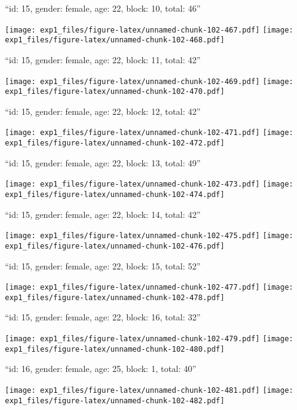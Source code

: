 \documentclass[11pt,,]{article}
\begin{document}
\newpage
[1] 

``id: 15, gender: female, age: 22, block: 10, total: 46''

\texttt{[image: exp1\_files/figure-latex/unnamed-chunk-102-467.pdf]}
\texttt{[image: exp1\_files/figure-latex/unnamed-chunk-102-468.pdf]}

\newpage
[1] 

``id: 15, gender: female, age: 22, block: 11, total: 42''

\texttt{[image: exp1\_files/figure-latex/unnamed-chunk-102-469.pdf]}
\texttt{[image: exp1\_files/figure-latex/unnamed-chunk-102-470.pdf]}

\newpage
[1] 

``id: 15, gender: female, age: 22, block: 12, total: 42''

\texttt{[image: exp1\_files/figure-latex/unnamed-chunk-102-471.pdf]}
\texttt{[image: exp1\_files/figure-latex/unnamed-chunk-102-472.pdf]}

\newpage
[1] 

``id: 15, gender: female, age: 22, block: 13, total: 49''

\texttt{[image: exp1\_files/figure-latex/unnamed-chunk-102-473.pdf]}
\texttt{[image: exp1\_files/figure-latex/unnamed-chunk-102-474.pdf]}

\newpage
[1] 

``id: 15, gender: female, age: 22, block: 14, total: 42''

\texttt{[image: exp1\_files/figure-latex/unnamed-chunk-102-475.pdf]}
\texttt{[image: exp1\_files/figure-latex/unnamed-chunk-102-476.pdf]}

\newpage
[1] 

``id: 15, gender: female, age: 22, block: 15, total: 52''

\texttt{[image: exp1\_files/figure-latex/unnamed-chunk-102-477.pdf]}
\texttt{[image: exp1\_files/figure-latex/unnamed-chunk-102-478.pdf]}

\newpage
[1] 

``id: 15, gender: female, age: 22, block: 16, total: 32''

\texttt{[image: exp1\_files/figure-latex/unnamed-chunk-102-479.pdf]}
\texttt{[image: exp1\_files/figure-latex/unnamed-chunk-102-480.pdf]}

\newpage
[1] 

``id: 16, gender: female, age: 25, block: 1, total: 40''

\texttt{[image: exp1\_files/figure-latex/unnamed-chunk-102-481.pdf]}
\texttt{[image: exp1\_files/figure-latex/unnamed-chunk-102-482.pdf]}
\end{document}
